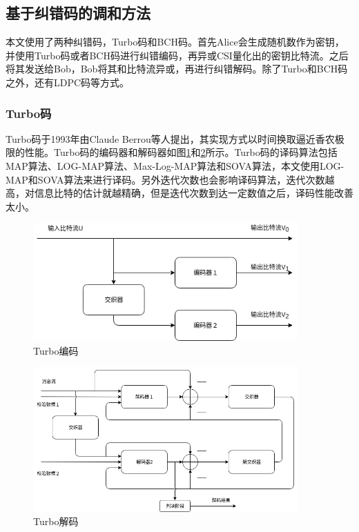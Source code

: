 \documentclass[master]{seuthesis} %
\begin{document}
\begin{Main}
\subsection{基于纠错码的调和方法}

本文使用了两种纠错码，Turbo码和BCH码。首先Alice会生成随机数作为密钥，并使用Turbo码或者BCH码进行纠错编码，再异或CSI量化出的密钥比特流。之后将其发送给Bob，Bob将其和比特流异或，再进行纠错解码。除了Turbo和BCH码之外，还有LDPC码等方式。

\subsubsection{Turbo码}

Turbo码于1993年由Claude Berrou等人提出，其实现方式以时间换取逼近香农极限的性能。Turbo码的编码器和解码器如图\ref{turbo_encode}和\ref{turbo_decode}所示。Turbo码的译码算法包括MAP算法、LOG-MAP算法、Max-Log-MAP算法和SOVA算法，本文使用LOG-MAP和SOVA算法来进行译码。另外迭代次数也会影响译码算法，迭代次数越高，对信息比特的估计就越精确，但是迭代次数到达一定数值之后，译码性能改善太小。

\begin{figure}[htbp!]
    \centering \includegraphics[width=0.9\textwidth]{images/turbo_encode} 
    \caption{Turbo编码}
    \label{turbo_encode}
\end{figure}

\begin{figure}[htbp!]
    \centering \includegraphics[width=0.9\textwidth]{images/turbo_decode} 
    \caption{Turbo解码}
    \label{turbo_decode}
\end{figure}



\end{Main}
\end{document}
